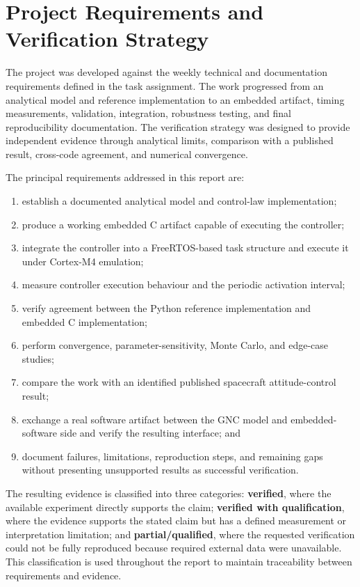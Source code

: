 \documentclass[11pt,a4paper]{article}
\begin{document}
\section{Project Requirements and Verification Strategy}

The project was developed against the weekly technical and documentation requirements defined in the task assignment. The work progressed from an analytical model and reference implementation to an embedded artifact, timing measurements, validation, integration, robustness testing, and final reproducibility documentation. The verification strategy was designed to provide independent evidence through analytical limits, comparison with a published result, cross-code agreement, and numerical convergence.\par

The principal requirements addressed in this report are:
\begin{enumerate}[leftmargin=*]
\item establish a documented analytical model and control-law implementation;
\item produce a working embedded C artifact capable of executing the controller;
\item integrate the controller into a FreeRTOS-based task structure and execute it under Cortex-M4 emulation;
\item measure controller execution behaviour and the periodic activation interval;
\item verify agreement between the Python reference implementation and embedded C implementation;
\item perform convergence, parameter-sensitivity, Monte Carlo, and edge-case studies;
\item compare the work with an identified published spacecraft attitude-control result;
\item exchange a real software artifact between the GNC model and embedded-software side and verify the resulting interface; and
\item document failures, limitations, reproduction steps, and remaining gaps without presenting unsupported results as successful verification.
\end{enumerate}

The resulting evidence is classified into three categories: \textbf{verified}, where the available experiment directly supports the claim; \textbf{verified with qualification}, where the evidence supports the stated claim but has a defined measurement or interpretation limitation; and \textbf{partial/qualified}, where the requested verification could not be fully reproduced because required external data were unavailable. This classification is used throughout the report to maintain traceability between requirements and evidence.
\end{document}
